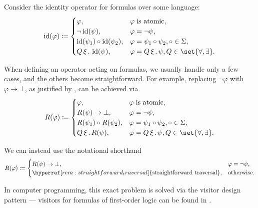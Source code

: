 \begin{remark}\label{rem:straightforward_traversal}
  Consider the identity operator for formulas over some language:
  \begin{equation*}
    \begin{aligned}
      \id(\varphi) \coloneqq \begin{cases}
        \varphi,                      &\varphi \T{is atomic}, \\
        \neg \id(\psi),                 &\varphi = \neg \psi, \\
        \id(\psi_1) \bincirc \id(\psi_2), &\varphi = \psi_1 \bincirc \psi_2, \bincirc \in \Sigma, \\
        \quantifier Q \xi \id(\psi),    &\varphi = \quantifier Q \xi \psi, Q \in \set{ \forall, \exists }. \\
      \end{cases}
    \end{aligned}
  \end{equation*}

  When defining an operator acting on formulas, we usually handle only a few cases, and the others become straightforward. For example, replacing \( \neg \varphi \) with \( \varphi \rightarrow \bot \), as justified by , can be achieved via
  \begin{equation*}
    \begin{aligned}
      R(\varphi) \coloneqq \begin{cases}
        \varphi,                      &\varphi \T{is atomic}, \\
        R(\psi) \rightarrow \bot,     &\varphi = \neg \psi, \\
        R(\psi_1) \bincirc R(\psi_2), &\varphi = \psi_1 \bincirc \psi_2, \bincirc \in \Sigma, \\
        \quantifier Q \xi R(\psi),    &\varphi = \quantifier Q \xi \psi, Q \in \set{ \forall, \exists }. \\
      \end{cases}
    \end{aligned}
  \end{equation*}

  We can instead use the notational shorthand
  \begin{equation*}
    \begin{aligned}
      R(\varphi) \coloneqq \begin{cases}
        R(\psi) \rightarrow \bot,                                                &\varphi = \neg \psi, \\
        \hyperref[rem:straightforward_traversal]{\T{straightforward traversal}}, &\T{otherwise.}
      \end{cases}
    \end{aligned}
  \end{equation*}

  In computer programming, this exact problem is solved via the visitor design pattern --- visitors for formulas of first-order logic can be found in \cite{code}.
\end{remark}

